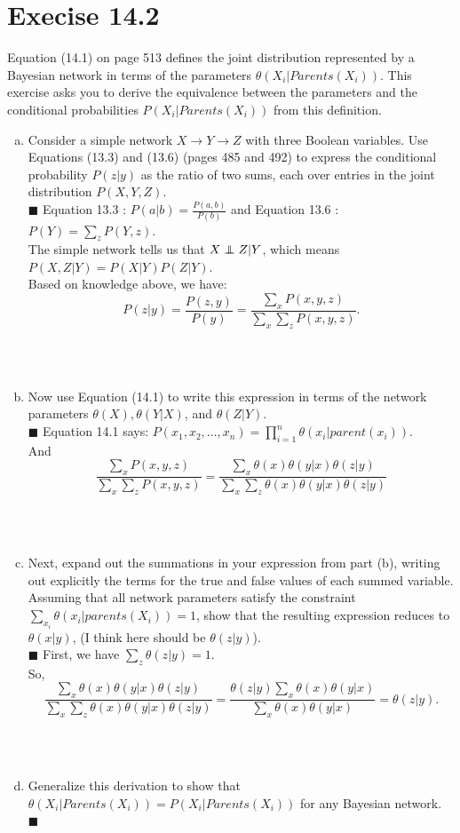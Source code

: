 \documentclass{article}
\newcommand{\solution}[1]{~\\ $\blacksquare$ \sffamily\upshape\selectfont #1
\normalfont ~\\~ }
\newcommand\independent{\protect\mathpalette{\protect\independenT}{\perp}}
\def\independenT#1#2{\mathrel{\rlap{$#1#2$}\mkern2mu{#1#2}}}
\begin{document}
\section{Execise 14.2}
Equation (14.1) on page 513 defines the joint distribution represented
by a Bayesian network in terms of the parameters $\theta
(X_i|Parents(X_i))$. This exercise asks you to derive the 
equivalence between the parameters and the conditional probabilities
$P(X_i|Parents(X_i))$ from this definition.
\begin{enumerate}[a.]
\item Consider a simple network $X \rightarrow Y \rightarrow Z$ with three
  Boolean variables. Use Equations (13.3) and (13.6) (pages 485 and
  492) to express the conditional probability $P(z|y)$ as the ratio of
  two sums, each over entries in the joint distribution $P(X,Y,Z)$. 
  \solution{
    Equation 13.3 : $P(a|b)=\frac{P(a,b)}{P(b)}$ and 
    Equation 13.6 : $P(Y)=\sum_zP(Y,z)$. \\
    The simple network tells us that $X\independent{Z}|Y$, which means
    $P(X,Z|Y) = P(X|Y)P(Z|Y)$. \\ 
    Based on knowledge above, we have:
    \[ P(z|y) = \frac{P(z,y)}{P(y)} =
    \frac{\sum_xP(x,y,z)}{\sum_x\sum_zP(x,y,z)}.\]
  }
\item Now use Equation (14.1) to write this expression in terms of the
  network parameters $\theta (X), \theta (Y|X)$, and $\theta(Z|Y)$.
  \solution{Equation 14.1 says:
    $P(x_1,x_2,\ldots,x_n)=\prod_{i=1}^n\theta (x_i|parent(x_i))$. \\
    And \[ \frac{\sum_xP(x,y,z)}{\sum_x\sum_zP(x,y,z)} =
    \frac{\sum_x\theta(x)\theta(y|x)\theta(z|y)} 
    {\sum_x\sum_z\theta(x)\theta(y|x)\theta(z|y)} \]
  }
\item Next, expand out the summations in your expression from part
  (b), writing out explicitly the terms for the true and false values
  of each summed variable. Assuming that all network parameters
  satisfy the constraint $\sum_{x_i}\theta (x_i|parents(X_i))=1$, show
  that the resulting expression reduces to \sout{$\theta(x|y)$}, (I
  think here should be $\theta(z|y)$). 
  \solution{
    First, we have $\sum_z\theta(z|y) = 1$. \\
    So, 
    \[ \frac{\sum_x\theta(x)\theta(y|x)\theta(z|y)} 
    {\sum_x\sum_z\theta(x)\theta(y|x)\theta(z|y)} = 
    \frac{\theta(z|y)\sum_x\theta(x)\theta(y|x)}
    {\sum_x\theta(x)\theta(y|x)} = \theta(z|y).\]
}
\item Generalize this derivation to show that $\theta
  (X_i|Parents(X_i))=P(X_i|Parents(X_i))$ for any Bayesian network.
  \solution{

}
\end{enumerate}
\end{document}
